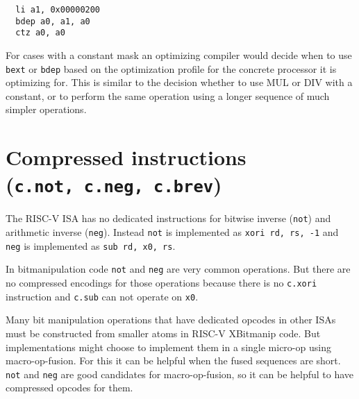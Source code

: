 \begin{verbatim}
  li a1, 0x00000200
  bdep a0, a1, a0
  ctz a0, a0
\end{verbatim}

For cases with a constant mask an optimizing compiler would decide when to use
\texttt{bext} or \texttt{bdep} based on the optimization profile for the
concrete processor it is optimizing for. This is similar to the decision
whether to use MUL or DIV with a constant, or to perform the same operation
using a longer sequence of much simpler operations.



%
%
%
%
%
%
%
%


\section{Compressed instructions (\texttt{c.not,\ c.neg,\ c.brev})}

The RISC-V ISA has no dedicated instructions for bitwise inverse (\texttt{not})
and arithmetic inverse (\texttt{neg}). Instead \texttt{not} is implemented as
\texttt{xori\ rd,\ rs,\ -1} and \texttt{neg} is implemented as
\texttt{sub\ rd,\ x0,\ rs}.

In bitmanipulation code \texttt{not} and \texttt{neg} are very common operations. But
there are no compressed encodings for those operations because there is no \texttt{c.xori}
instruction and \texttt{c.sub} can not operate on \texttt{x0}.

Many bit manipulation operations that have dedicated opcodes in other ISAs
must be constructed from smaller atoms in RISC-V XBitmanip code. But
implementations might choose to implement them in a single micro-op using
macro-op-fusion. For this it can be helpful when the fused sequences are short.
\texttt{not} and \texttt{neg} are good candidates for macro-op-fusion, so
it can be helpful to have compressed opcodes for them.

